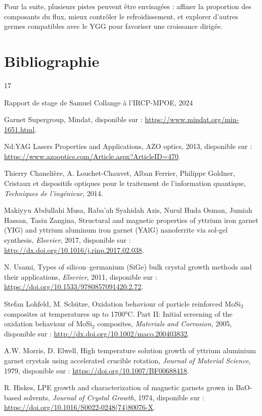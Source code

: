 \documentclass{rapportENSCP}
\begin{document}
Pour la suite, plusieurs pistes peuvent être envisagées : affiner la proportion des composants du flux, mieux contrôler le refroidissement, et explorer d’autres germes compatibles avec le YGG pour favoriser une croissance dirigée. 

\section{Bibliographie}
\begin{thebibliography}{17}

Rapport de stage de Samuel Collange à l'IRCP-MPOE, 2024 

 Garnet Supergroup, Mindat, disponible sur : \url{https://www.mindat.org/min-1651.html}.

 Nd:YAG Lasers Properties and Applications, AZO optics, 2013, disponible sur : \url{https://www.azooptics.com/Article.aspx?ArticleID=470}.

 Thierry Chanelière, A. Louchet-Chauvet, Alban Ferrier, Philippe Goldner, Cristaux et dispositifs optiques pour le traitement de l’information quantique, \textit{Techniques de l’ingénieur}, 2014.

 Makiyyu Abdullahi Musa, Raba’ah Syahidah Azis, Nurul Huda Osman, Jumiah Hassan, Tasiu Zangina, Structural and magnetic properties of yttrium iron garnet (YIG) and yttrium aluminum iron garnet (YAlG) nanoferrite via sol-gel synthesis, \textit{Elsevier}, 2017, disponible sur : \url{http://dx.doi.org/10.1016/j.rinp.2017.02.038}.

 N. Usami, Types of silicon–germanium (SiGe) bulk crystal growth methods and their applications, \textit{Elsevier}, 2011, disponible sur : \url{https://doi.org/10.1533/9780857091420.2.72}.

 Stefan Lohfeld, M. Schütze, Oxidation behaviour of particle reinforced MoSi$_2$ composites at temperatures up to 1700°C. Part II: Initial screening of the oxidation behaviour of MoSi$_2$ composites, \textit{Materials and Corrosion}, 2005, disponible sur : \url{http://dx.doi.org/10.1002/maco.200403832}.

 A.W. Morris, D. Elwell, High temperature solution growth of yttrium aluminium garnet crystals using accelerated crucible rotation, \textit{Journal of Material Science}, 1979, disponible sur : \url{https://doi.org/10.1007/BF00688418}.

 R. Hiskes, LPE growth and characterization of magnetic garnets grown in BaO-based solvents, \textit{Journal of Crystal Growth}, 1974, disponible sur : \url{https://doi.org/10.1016/S0022-0248(74)80076-X}.


\end{thebibliography}
\end{document}
